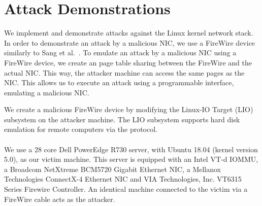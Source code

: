 \section{Attack Demonstrations}\label{Sec:setup}


We implement and demonstrate \compound attacks against the Linux kernel network stack. 
In order to demonstrate an attack by a malicious NIC, we use a FireWire device similarly to Sang et al.~\cite{SLND10}. To emulate an attack by a malicious NIC using a FireWire device, we create an \iova{} page table sharing between the FireWire and the actual NIC. This way, the attacker machine can access the same pages as the NIC. This allows us to execute an attack using a programmable interface, emulating a malicious NIC.


We create a malicious FireWire device by modifying the Linux-IO Target (LIO) subsystem on the attacker machine. The LIO subsystem supports hard disk emulation for remote computers via the \spb{} protocol. 

\DIFdelbegin \paragraph{}
\addtocounter{paragraph}{-1}%
\DIFdelend \DIFaddbegin \smallskip
\noindent\textbf{}
\DIFaddend We use a 28 core Dell PowerEdge R730 server, with Ubuntu 18.04 (kernel version 5.0), as our victim machine. This server is equipped with an Intel VT-d IOMMU, a Broadcom NetXtreme BCM5720 Gigabit Ethernet NIC, a Mellanox Technologies ConnectX-4 Ethernet NIC and VIA Technologies, Inc. VT6315 Series Firewire Controller. An identical machine connected to the victim via a FireWire cable acts as the attacker. 

